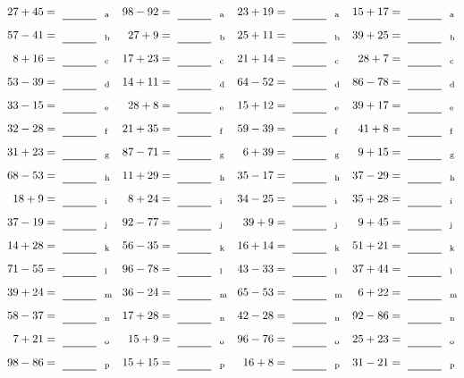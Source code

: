 \documentclass
[
  draft    = true,
  fontsize = 11pt,
  parskip  = half-
]
{scrartcl}
\begin{document}
\clearpage
\begin{align*}
    \pline{27+45}&=\rline{a}
  & \pline{98-92}&=\rline{a}
  & \pline{23+19}&=\rline{a}
  & \pline{15+17}&=\rline{a} \\[1ex]
    \pline{57-41}&=\rline{b}
  & \pline{27+9}&=\rline{b}
  & \pline{25+11}&=\rline{b}
  & \pline{39+25}&=\rline{b} \\[1ex]
    \pline{8+16}&=\rline{c}
  & \pline{17+23}&=\rline{c}
  & \pline{21+14}&=\rline{c}
  & \pline{28+7}&=\rline{c} \\[1ex]
    \pline{53-39}&=\rline{d}
  & \pline{14+11}&=\rline{d}
  & \pline{64-52}&=\rline{d}
  & \pline{86-78}&=\rline{d} \\[1ex]
    \pline{33-15}&=\rline{e}
  & \pline{28+8}&=\rline{e}
  & \pline{15+12}&=\rline{e}
  & \pline{39+17}&=\rline{e} \\[1ex]
    \pline{32-28}&=\rline{f}
  & \pline{21+35}&=\rline{f}
  & \pline{59-39}&=\rline{f}
  & \pline{41+8}&=\rline{f} \\[1ex]
    \pline{31+23}&=\rline{g}
  & \pline{87-71}&=\rline{g}
  & \pline{6+39}&=\rline{g}
  & \pline{9+15}&=\rline{g} \\[1ex]
    \pline{68-53}&=\rline{h}
  & \pline{11+29}&=\rline{h}
  & \pline{35-17}&=\rline{h}
  & \pline{37-29}&=\rline{h} \\[1ex]
    \pline{18+9}&=\rline{i}
  & \pline{8+24}&=\rline{i}
  & \pline{34-25}&=\rline{i}
  & \pline{35+28}&=\rline{i} \\[1ex]
    \pline{37-19}&=\rline{j}
  & \pline{92-77}&=\rline{j}
  & \pline{39+9}&=\rline{j}
  & \pline{9+45}&=\rline{j} \\[1ex]
    \pline{14+28}&=\rline{k}
  & \pline{56-35}&=\rline{k}
  & \pline{16+14}&=\rline{k}
  & \pline{51+21}&=\rline{k} \\[1ex]
    \pline{71-55}&=\rline{l}
  & \pline{96-78}&=\rline{l}
  & \pline{43-33}&=\rline{l}
  & \pline{37+44}&=\rline{l} \\[1ex]
    \pline{39+24}&=\rline{m}
  & \pline{36-24}&=\rline{m}
  & \pline{65-53}&=\rline{m}
  & \pline{6+22}&=\rline{m} \\[1ex]
    \pline{58-37}&=\rline{n}
  & \pline{17+28}&=\rline{n}
  & \pline{42-28}&=\rline{n}
  & \pline{92-86}&=\rline{n} \\[1ex]
    \pline{7+21}&=\rline{o}
  & \pline{15+9}&=\rline{o}
  & \pline{96-76}&=\rline{o}
  & \pline{25+23}&=\rline{o} \\[1ex]
    \pline{98-86}&=\rline{p}
  & \pline{15+15}&=\rline{p}
  & \pline{16+8}&=\rline{p}
  & \pline{31-21}&=\rline{p}
\end{align*}
\end{document}
